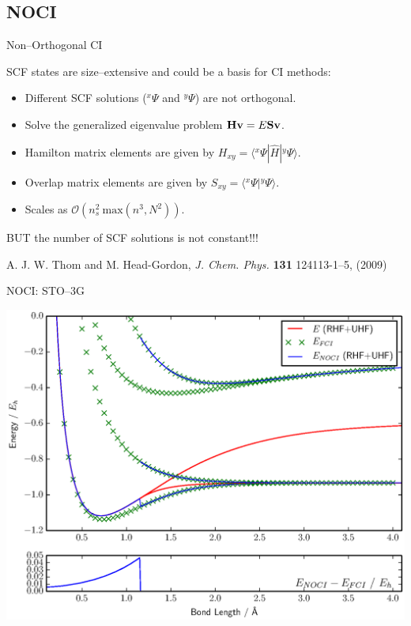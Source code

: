 \documentclass{beamer}
\newcommand{\braket}[3] {{\langle #1 | #2 | #3 \rangle}}
\newcommand{\brket}[2] {{\langle #1 | #2  \rangle}}
\newcommand{\up}[2] {{^{#1}\!#2}}
\begin{document}
\subsection{NOCI}
\begin{frame}{Non--Orthogonal CI}

SCF states are size--extensive and could be a basis for CI methods:
\vspace{1em}
 \begin{itemize}
  \item Different SCF solutions ($\up{x}{\Psi}$ and $\up{y}{\Psi}$) are \alert{not orthogonal}.
  \item Solve the generalized eigenvalue problem ${\bf H v}=E{\bf S v}$.
  \item Hamilton matrix elements are given by $H_{xy}=\braket{\up{x}\Psi}{\hat H}{\up y\Psi}$.
  \item Overlap matrix elements are given by $S_{xy}=\brket{\up{x}\Psi}{\up y\Psi}$.
  \item Scales as $\mathcal{O}\left( n_s^2\ \mathrm{max}\left(n^3, N^2\right) \right).$
 \end{itemize}
 \vspace{0.5em}
   \begin{center} 
BUT the number of SCF solutions is \alert{not constant}!!!
  \end{center}

\vspace{0.5em} 
{\tiny A. J. W. Thom and M. Head-Gordon, {\it J. Chem. Phys.} {\bf 131} 124113-1--5, (2009)}
\end{frame}

\begin{frame}{NOCI:  STO--3G}
\vspace{-1em}
  \begin{center}
  \includegraphics[scale=0.4]{H2_normal}
  \end{center}
  \vspace{-1em}
\end{frame}
\end{document}
